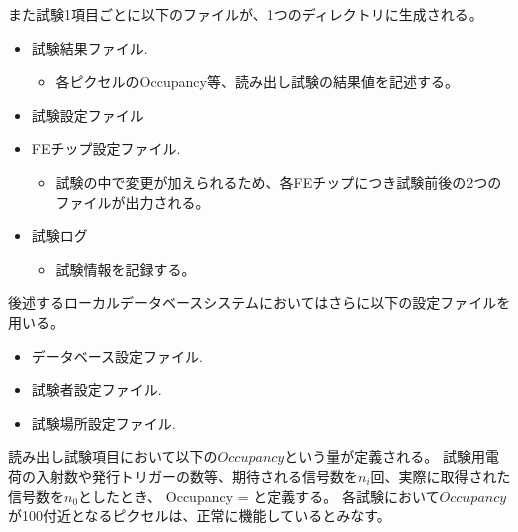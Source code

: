 また試験1項目ごとに以下のファイルが、1つのディレクトリに生成される。
\begin{itemize}
  \item 試験結果ファイル.
  \begin{itemize}
    \item 各ピクセルのOccupancy等、読み出し試験の結果値を記述する。
  \end{itemize}
  \item 試験設定ファイル
  \item FEチップ設定ファイル.
  \begin{itemize}
    \item 試験の中で変更が加えられるため、各FEチップにつき試験前後の2つのファイルが出力される。
  \end{itemize}
  \item 試験ログ
  \begin{itemize}
    \item 試験情報を記録する。
  \end{itemize}
\end{itemize}

後述するローカルデータベースシステムにおいてはさらに以下の設定ファイルを用いる。
\begin{itemize}
  \item データベース設定ファイル.
  \item 試験者設定ファイル. 
  \item 試験場所設定ファイル.
\end{itemize}

読み出し試験項目において以下の$Occupancy$という量が定義される。
試験用電荷の入射数や発行トリガーの数等、期待される信号数を$n_i$回、実際に取得された信号数を$n_0$としたとき、
\bbb
\label{occupancy}
Occupancy =  
\eee
と定義する。
各試験において$Occupancy$が100付近となるピクセルは、正常に機能しているとみなす。

